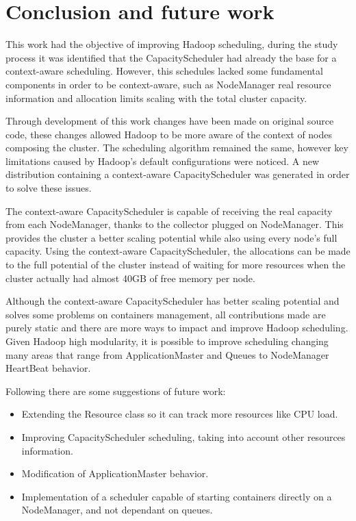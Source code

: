 \chapter{Conclusion and future work}
This work had the objective of improving Hadoop scheduling, during the study process it was identified that the CapacityScheduler had already the base for a context-aware scheduling. However, this schedules lacked some fundamental components in order to be context-aware, such as NodeManager real resource information and allocation limits scaling with the total cluster capacity.

Through development of this work changes have been made on original source code, these changes allowed Hadoop to be more aware of the context of nodes composing the cluster. The scheduling algorithm remained the same, however key limitations caused by Hadoop's default configurations were noticed. A new distribution containing a context-aware CapacityScheduler was generated in order to solve these issues.

The context-aware CapacityScheduler is capable of receiving the real capacity from each NodeManager, thanks to the collector plugged on NodeManager. This provides the cluster a better scaling potential while also using every node's full capacity. Using the context-aware CapacityScheduler, the allocations can be made to the full potential of the cluster instead of waiting for more resources when the cluster actually had almost 40GB of free memory per node.

Although the context-aware CapacityScheduler has better scaling potential and solves some problems on containers management, all contributions made are purely static and there are more ways to impact and improve Hadoop scheduling. Given Hadoop high modularity, it is possible to improve scheduling changing many areas that range from ApplicationMaster and Queues to NodeManager HeartBeat behavior.

Following there are some suggestions of future work:

\begin{itemize}
\item Extending the Resource class so it can track more resources like CPU load.
\item Improving CapacityScheduler scheduling, taking into account other resources information.
\item Modification of ApplicationMaster behavior.
\item Implementation of a scheduler capable of starting containers directly on a NodeManager, and not dependant on queues.
\end{itemize}
